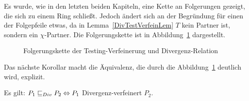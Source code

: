 Es wurde, wie in den letzten beiden Kapiteln, eine Kette an Folgerungen
gezeigt, die sich zu einem Ring schließt. Jedoch ändert sich an der Begründung
für einen der Folgepfeile etwas, da in Lemma~\ref{DivTestVerfeinLem} $T$ kein
Partner ist, sondern ein $\chi$-Partner. Die Folgerungskette ist in
Abbildung~\ref{FolgerungsketteDiv} dargestellt.

\begin{figure}[h!tbp]
  \begin{center}
    \caption{Folgerungskette der Testing-Verfeinerung und Divergenz-Relation}
  \label{FolgerungsketteDiv}
  \end{center}
\end{figure}

Das nächste Korollar macht die Äquivalenz, die durch die
Abbildung~\ref{FolgerungsketteDiv} deutlich wird, explizit.

\begin{Kor}
  Es gilt: $P_1 \sqsubseteq  _{Div} P_2 \Leftrightarrow P_1$ Divergenz-verfeinert $P_2$.
\end{Kor}
